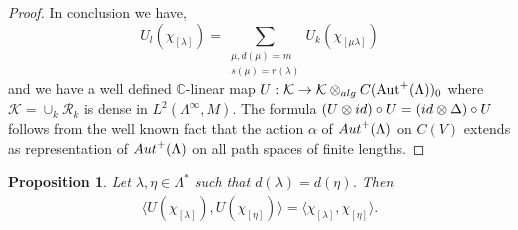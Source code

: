 \documentclass{amsart}
\theoremstyle{plain}
\newtheorem{proposition}[subsection]{Proposition}
\theoremstyle{definition}
\theoremstyle{remark}
\numberwithin{equation}{section}
\newcommand{\raro}{\rightarrow}
\begin{document}
\begin{proof}
In conclusion we have,
\begin{equation*}
U_{l}(\chi_{[\lambda]})=\sum\limits_{\substack{\mu,d(\mu)=m\\ s(\mu)=r(\lambda)}}U_{k}(\chi_{[\mu\lambda]}) 
\end{equation*}
and we have a well defined $\mathbb{C}$-linear map $U:\mathcal{K}\raro \mathcal{K}\otimes_{{\rm alg}} C(\text{Aut}^{+}(\Lambda))_{0}$ where $\mathcal{K}=\cup_{k}\mathcal{R}_{k}$ is dense in $L^2(\Lambda^{\infty},M)$. The formula $(U\otimes{\rm id})\circ U=({\rm id}\otimes \Delta)\circ U$ follows from the well known fact that the action $\alpha$ of ${\rm Aut}^{+}(\Lambda)$ on $C(V)$ extends as representation of ${\rm Aut}^{+}(\Lambda)$ on all path spaces of finite lengths.
\end{proof}
\begin{proposition}
    Let $\lambda,\eta\in\Lambda^{\ast}$ such that $d(\lambda)=d(\eta)$. Then 
    \begin{eqnarray}
    \label{inner product preserving same length}
     \langle U(\chi_{[\lambda]}),U(\chi_{[\eta]})\rangle=\langle \chi_{[\lambda]}, \chi_{[\eta]} \rangle.   
    \end{eqnarray}
\end{proposition}
\end{document}
